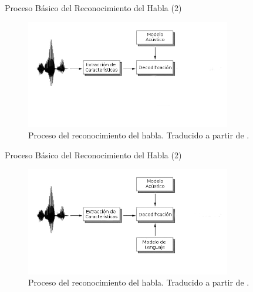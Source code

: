 \begin{frame}{Proceso B\'asico del Reconocimiento del Habla (2)}

\begin{figure}[H] 
\centering
\includegraphics[width=0.8\textwidth]{./graphics/proceso_2.png}
\caption{Proceso del reconocimiento del habla. Traducido a partir de \protect\cite{VerenichASR}.}
\label{figure:proceso}
\end{figure}
\end{frame}

\begin{frame}{Proceso B\'asico del Reconocimiento del Habla (2)}

\begin{figure}[H] 
\centering
\includegraphics[width=0.8\textwidth]{./graphics/proceso_3.png}
\caption{Proceso del reconocimiento del habla. Traducido a partir de \protect\cite{VerenichASR}.}
\label{figure:proceso}
\end{figure}
\end{frame}

